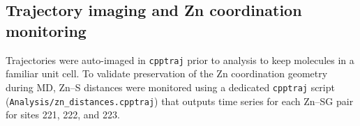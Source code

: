 \subsection{Trajectory imaging and Zn coordination monitoring}
Trajectories were auto-imaged in \texttt{cpptraj} prior to analysis to keep molecules in a familiar unit cell. To validate preservation of the Zn coordination geometry during MD, Zn--S distances were monitored using a dedicated \texttt{cpptraj} script (\texttt{Analysis/zn\_distances.cpptraj}) that outputs time series for each Zn--SG pair for sites 221, 222, and 223.

